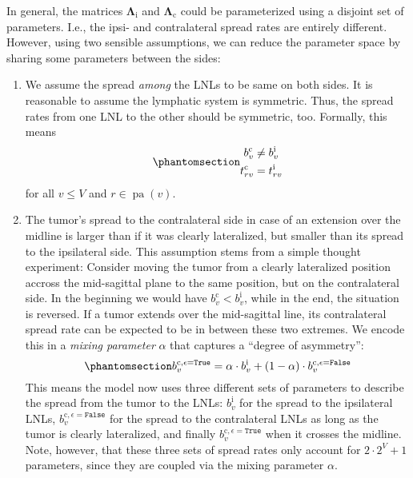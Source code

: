 \documentclass[
  sn-mathphys-num,
]{sn-jnl}
\providecommand{\tightlist}{%
  \setlength{\itemsep}{0pt}\setlength{\parskip}{0pt}}\usepackage{longtable,booktabs,array}
\begin{document}
In general, the matrices \(\boldsymbol{\Lambda}_\text{i}\) and
\(\boldsymbol{\Lambda}_\text{c}\) could be parameterized using a
disjoint set of parameters. I.e., the ipsi- and contralateral spread
rates are entirely different. However, using two sensible assumptions,
we can reduce the parameter space by sharing some parameters between the
sides:

\begin{enumerate}
\def\labelenumi{\arabic{enumi}.}
\tightlist
\item
  We assume the spread \emph{among} the LNLs to be same on both sides.
  It is reasonable to assume the lymphatic system is symmetric. Thus,
  the spread rates from one LNL to the other should be symmetric, too.
  Formally, this means\\
  \begin{equation}\phantomsection\label{eq-symmetries}{
  \begin{aligned}
  b_v^\text{c} &\neq b_v^\text{i} \\
  t_{rv}^\text{c} &= t_{rv}^\text{i}
  \end{aligned}
  }\end{equation} for all \(v \leq V\) and
  \(r \in \operatorname{pa}(v)\).
\item
  The tumor's spread to the contralateral side in case of an extension
  over the midline is larger than if it was clearly lateralized, but
  smaller than its spread to the ipsilateral side. This assumption stems
  from a simple thought experiment: Consider moving the tumor from a
  clearly lateralized position accross the mid-sagittal plane to the
  same position, but on the contralateral side. In the beginning we
  would have \(b_v^\text{c} < b_v^\text{i}\), while in the end, the
  situation is reversed. If a tumor extends over the mid-sagittal line,
  its contralateral spread rate can be expected to be in between these
  two extremes. We encode this in a \emph{mixing parameter} \(\alpha\)
  that captures a ``degree of asymmetry'':\\
  \begin{equation}\phantomsection\label{eq-mixing}{
  b_v^{\text{c},\epsilon=\texttt{True}} = \alpha \cdot b_v^\text{i} + (1 - \alpha) \cdot b_v^{\text{c},\epsilon=\texttt{False}}
  }\end{equation} This means the model now uses three different sets of
  parameters to describe the spread from the tumor to the LNLs:
  \(b^\text{i}_v\) for the spread to the ipsilateral LNLs,
  \(b_v^{\text{c},\epsilon=\texttt{False}}\) for the spread to the
  contralateral LNLs as long as the tumor is clearly lateralized, and
  finally \(b_v^{\text{c},\epsilon=\texttt{True}}\) when it crosses the
  midline. Note, however, that these three sets of spread rates only
  account for \(2 \cdot 2^V + 1\) parameters, since they are coupled via
  the mixing parameter \(\alpha\).
\end{enumerate}
\end{document}
